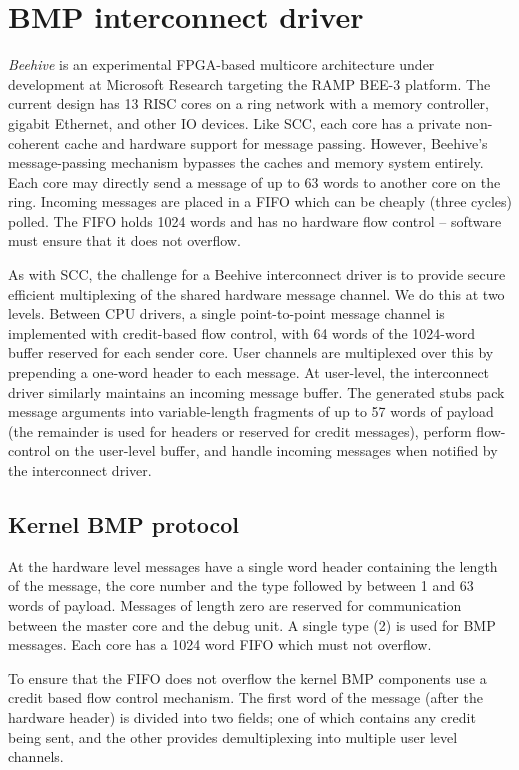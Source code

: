 \documentclass[a4paper,twoside]{report} %
\begin{document}
\section{BMP interconnect driver}

\emph{Beehive} is an experimental FPGA-based multicore architecture
under development at Microsoft Research\cite{beehive:hwman} targeting
the RAMP BEE-3 platform\cite{davis:bee3}. The current design has 13
RISC cores on a ring network with a memory controller, gigabit
Ethernet, and other IO devices. Like SCC, each core has a private
non-coherent cache and hardware support for message passing. However,
Beehive's message-passing mechanism bypasses the caches and memory
system entirely.  Each core may directly send a message of up to 63
words to another core on the ring.  Incoming messages are placed in a
FIFO which can be cheaply (three cycles) polled. The FIFO holds 1024
words and has no hardware flow control -- software must ensure that it
does not overflow.

As with SCC, the challenge for a Beehive interconnect driver is to
provide secure efficient multiplexing of the shared hardware message
channel.  We do this at two levels. Between CPU drivers, a single
point-to-point message channel is implemented with credit-based flow
control, with 64 words of the 1024-word buffer reserved for each
sender core.  User channels are multiplexed over this by prepending a
one-word header to each message. At user-level, the interconnect
driver similarly maintains an incoming message buffer. The generated
stubs pack message arguments into variable-length fragments of up to
57 words of payload (the remainder is used for headers or reserved for
credit messages), perform flow-control on the user-level buffer, and
handle incoming messages when notified by the interconnect driver.

\subsection{Kernel BMP protocol}

At the hardware level messages have a single word header containing
the length of the message, the core number and the type followed by
between 1 and 63 words of payload.  Messages of length zero are
reserved for communication between the master core and the debug unit.
A single type (2) is used for BMP messages.  Each core has a 1024 word
FIFO which must not overflow.

To ensure that the FIFO does not overflow the kernel BMP components
use a credit based flow control mechanism.  The first word of the
message (after the hardware header) is divided into two fields; one of
which contains any credit being sent, and the other provides
demultiplexing into multiple user level channels.
\end{document}
